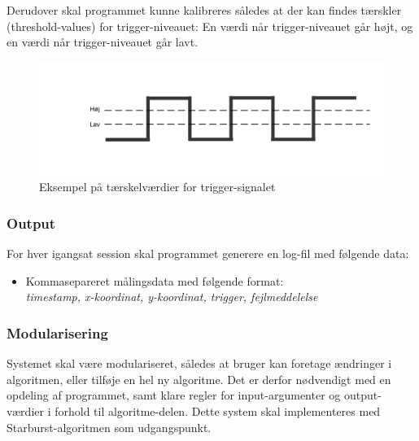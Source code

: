 \documentclass[rapport.tex]{subfiles}
\begin{document}
	
	Derudover skal programmet kunne kalibreres således at der kan findes tærskler (threshold-values) for trigger-niveauet: En værdi når trigger-niveauet går højt, og en værdi når trigger-niveauet går lavt.
	
	\begin{figure}[H]
		\centering
		\includegraphics[width=0.7\linewidth]{../Trigger-threshold}
		\caption{Eksempel på tærskelværdier for trigger-signalet}
		\label{fig:Trigger-threshold}
	\end{figure}
	
	
	
	\subsubsection{Output}
	\label{sec:output}
	For hver igangsat session skal programmet generere en log-fil med følgende data:
	\indent \begin{itemize}
		
		\item 	Kommasepareret målingsdata med følgende format: \\
		\textit{timestamp, x-koordinat, y-koordinat, trigger, fejlmeddelelse}
	\end{itemize}
	
	\subsubsection{Modularisering}
	Systemet skal være modulariseret, således at bruger kan foretage ændringer i algoritmen, eller tilføje en hel ny algoritme. Det er derfor nødvendigt med en opdeling af programmet, samt klare regler for input-argumenter og output-værdier i forhold til algoritme-delen. 
	Dette system skal implementeres med Starburst-algoritmen som udgangspunkt.
	
\end{document}
